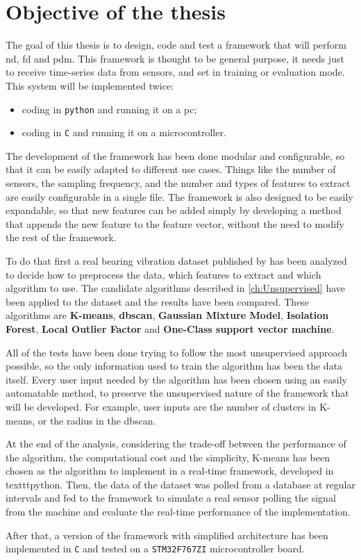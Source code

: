 \section{Objective of the thesis}
\label{sec:objectives}

The goal of this thesis is to design, code and test a framework that will perform \gls{nd}, \gls{fd} and \gls{pdm}. This framework is thought to be general purpose, it needs just to receive time-series data from sensors, and set in training or evaluation mode.
This system will be implemented twice:
\begin{itemize}
    \item  coding in \texttt{python} and running it on a \gls{pc};
    \item   coding in \texttt{C} and running it on a microcontroller.
\end{itemize}

The development of the framework has been done modular and configurable, so that it can be easily adapted to different use cases. Things like the number of sensors, the sampling frequency, and the number and types of features to extract are easily configurable in a single file. The framework is also designed to be easily expandable, so that new features can be added simply by developing a method that appends the new feature to the feature vector, without the need to modify the rest of the framework.

To do that first a real bearing vibration dataset published by \cite{IMSpaper} has been analyzed to decide how to preprocess the data, which features to extract and which algorithm to use. 
The candidate algorithms described in \autoref{ch:Unsupervised} have been applied to the dataset and the results have been compared. These algorithms are \textbf{K-means}, \textbf{\gls{dbscan}}, \textbf{Gaussian Mixture Model}, \textbf{Isolation Forest}, \textbf{Local Outlier Factor} and \textbf{One-Class support vector machine}. 

All of the tests have been done trying to follow the most unsupervised approach possible, so the only information used to train the algorithm has been the data itself. Every user input needed by the algorithm has been chosen using an easily automatable method, to preserve the unsupervised nature of the framework that will be developed. For example, user inputs are the number of clusters in K-means, or the radius in the \gls{dbscan}.

At the end of the analysis, considering the trade-off between the performance of the algorithm, the computational cost and the simplicity, K-means has been chosen as the algorithm to implement in a real-time framework, developed in texttt{python}. Then, the data of the dataset was polled from a database at regular intervals and fed to the framework to simulate a real sensor polling the signal from the machine and evaluate the real-time performance of the implementation.

After that, a version of the framework with simplified architecture has been implemented in \texttt{C} and tested on a \texttt{STM32F767ZI} microcontroller board.
